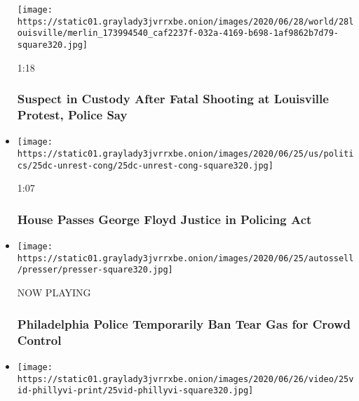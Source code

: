 \begin{itemize}
  \texttt{[image: https://static01.graylady3jvrrxbe.onion/images/2020/06/28/world/28louisville/merlin\_173994540\_caf2237f-032a-4169-b698-1af9862b7d79-square320.jpg]}

  1:18

  \hypertarget{suspect-in-custody-after-fatal-shooting-at-louisville-protest-police-say}{%
  \subsubsection{Suspect in Custody After Fatal Shooting at Louisville
  Protest, Police
  Say}\label{suspect-in-custody-after-fatal-shooting-at-louisville-protest-police-say}}
\item
  \href{https://www.nytimes3xbfgragh.onion/video/us/politics/100000007211025/house-passes-police-reform-bill.html?action=click\&module=video-series-bar\&region=header\&pgtype=Article\&playlistId=video/minneapolis-george-floyd-death-video}{}

  \texttt{[image: https://static01.graylady3jvrrxbe.onion/images/2020/06/25/us/politics/25dc-unrest-cong/25dc-unrest-cong-square320.jpg]}

  1:07

  \hypertarget{house-passes-george-floyd-justice-in-policing-act}{%
  \subsubsection{House Passes George Floyd Justice in Policing
  Act}\label{house-passes-george-floyd-justice-in-policing-act}}
\item
  \texttt{[image: https://static01.graylady3jvrrxbe.onion/images/2020/06/25/autossell/presser/presser-square320.jpg]}

  NOW PLAYING

  \hypertarget{philadelphia-police-temporarily-ban-tear-gas-for-crowd-control-2}{%
  \subsubsection{Philadelphia Police Temporarily Ban Tear Gas for Crowd
  Control}\label{philadelphia-police-temporarily-ban-tear-gas-for-crowd-control-2}}
\item
  \href{https://www.nytimes3xbfgragh.onion/video/us/100000007174941/philadelphia-tear-gas-george-floyd-protests.html?action=click\&module=video-series-bar\&region=header\&pgtype=Article\&playlistId=video/minneapolis-george-floyd-death-video}{}

  \texttt{[image: https://static01.graylady3jvrrxbe.onion/images/2020/06/26/video/25vid-phillyvi-print/25vid-phillyvi-square320.jpg]}


\end{itemize}
